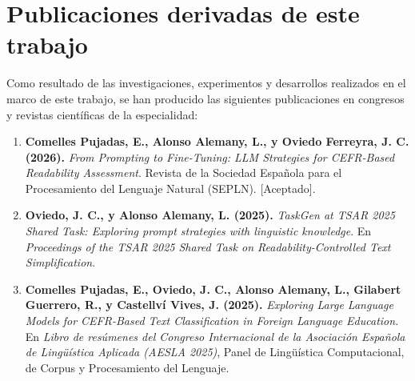 \section{Publicaciones derivadas de este trabajo}
\label{sec:publicaciones}

Como resultado de las investigaciones, experimentos y desarrollos realizados en el marco de este trabajo, se han producido las siguientes publicaciones en congresos y revistas científicas de la especialidad:

\begin{enumerate}
    \item \textbf{Comelles Pujadas, E., Alonso Alemany, L., y Oviedo Ferreyra, J. C. (2026).} 
    \textit{From Prompting to Fine-Tuning: LLM Strategies for CEFR-Based Readability Assessment}. 
    Revista de la Sociedad Española para el Procesamiento del Lenguaje Natural (SEPLN). [Aceptado].

    \item \textbf{Oviedo, J. C., y Alonso Alemany, L. (2025).} 
    \textit{TaskGen at TSAR 2025 Shared Task: Exploring prompt strategies with linguistic knowledge}. 
    En \textit{Proceedings of the TSAR 2025 Shared Task on Readability-Controlled Text Simplification}.

    \item \textbf{Comelles Pujadas, E., Oviedo, J. C., Alonso Alemany, L., Gilabert Guerrero, R., y Castellví Vives, J. (2025).} 
    \textit{Exploring Large Language Models for CEFR-Based Text Classification in Foreign Language Education}. 
    En \textit{Libro de resúmenes del Congreso Internacional de la Asociación Española de Lingüística Aplicada (AESLA 2025)}, Panel de Lingüística Computacional, de Corpus y Procesamiento del Lenguaje.
\end{enumerate}